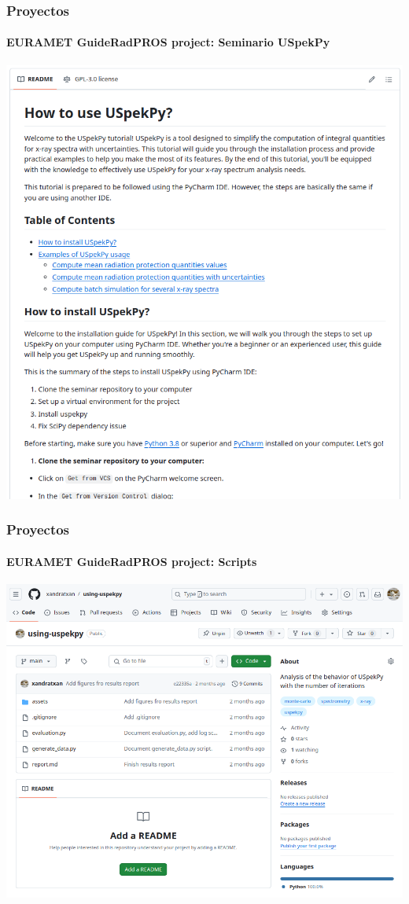 \documentclass{beamer}
\begin{document}
	\begin{frame}
		\frametitle{Proyectos}
		\framesubtitle{EURAMET GuideRadPROS project: Seminario USpekPy}
		\centering
		\includegraphics[width=\textwidth]{GRP_seminar}
	\end{frame}
	
	\begin{frame}
		\frametitle{Proyectos}
		\framesubtitle{EURAMET GuideRadPROS project: Scripts}
		\centering
		\includegraphics[width=\textwidth]{GRP_analisis}
	\end{frame}
	
\end{document}
